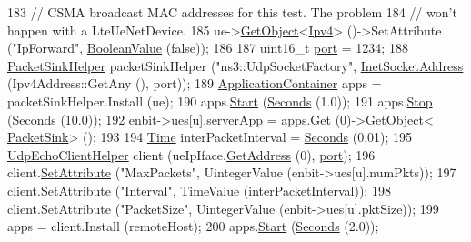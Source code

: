 \begin{DoxyCode}
183           \textcolor{comment}{// CSMA broadcast MAC addresses for this test. The problem}
184           \textcolor{comment}{// won't happen with a LteUeNetDevice. }
185           ue->\hyperlink{classns3_1_1Object_a13e18c00017096c8381eb651d5bd0783}{GetObject}<\hyperlink{classns3_1_1Ipv4}{Ipv4}> ()->SetAttribute (\textcolor{stringliteral}{"IpForward"}, 
      \hyperlink{classns3_1_1BooleanValue}{BooleanValue} (\textcolor{keyword}{false}));
186           
187           uint16\_t \hyperlink{dsdv-manet_8cc_a8e0798404bf2cf5dabb84c5ba9a4f236}{port} = 1234;
188           \hyperlink{classns3_1_1PacketSinkHelper}{PacketSinkHelper} packetSinkHelper (\textcolor{stringliteral}{"ns3::UdpSocketFactory"}, 
      \hyperlink{classns3_1_1InetSocketAddress}{InetSocketAddress} (Ipv4Address::GetAny (), port));
189           \hyperlink{classns3_1_1ApplicationContainer}{ApplicationContainer} apps = packetSinkHelper.Install (ue);
190           apps.\hyperlink{classns3_1_1ApplicationContainer_a8eff87926507020bbe3e1390358a54a7}{Start} (\hyperlink{group__timecivil_ga33c34b816f8ff6628e33d5c8e9713b9e}{Seconds} (1.0));
191           apps.\hyperlink{classns3_1_1ApplicationContainer_adfc52f9aa4020c8714679b00bbb9ddb3}{Stop} (\hyperlink{group__timecivil_ga33c34b816f8ff6628e33d5c8e9713b9e}{Seconds} (10.0));
192           enbit->ues[u].serverApp = apps.\hyperlink{classns3_1_1ApplicationContainer_a9e565807abd4213a56566a7ccd8d7509}{Get} (0)->\hyperlink{classns3_1_1Object_a13e18c00017096c8381eb651d5bd0783}{GetObject}<
      \hyperlink{classns3_1_1PacketSink}{PacketSink}> ();
193           
194           \hyperlink{classns3_1_1Time}{Time} interPacketInterval = \hyperlink{group__timecivil_ga33c34b816f8ff6628e33d5c8e9713b9e}{Seconds} (0.01);
195           \hyperlink{classns3_1_1UdpEchoClientHelper}{UdpEchoClientHelper} client (ueIpIface.\hyperlink{classns3_1_1Ipv4InterfaceContainer_ae63208dcd222be986822937ee4aa828c}{GetAddress} (0), 
      \hyperlink{dsdv-manet_8cc_a8e0798404bf2cf5dabb84c5ba9a4f236}{port});
196           client.\hyperlink{classns3_1_1UdpEchoClientHelper_a11228c069ad896f8ed13f4d37c13f51d}{SetAttribute} (\textcolor{stringliteral}{"MaxPackets"}, UintegerValue (enbit->ues[u].numPkts));
197           client.SetAttribute (\textcolor{stringliteral}{"Interval"}, TimeValue (interPacketInterval));
198           client.SetAttribute (\textcolor{stringliteral}{"PacketSize"}, UintegerValue (enbit->ues[u].pktSize));
199           apps = client.Install (remoteHost);
200           apps.\hyperlink{classns3_1_1ApplicationContainer_a8eff87926507020bbe3e1390358a54a7}{Start} (\hyperlink{group__timecivil_ga33c34b816f8ff6628e33d5c8e9713b9e}{Seconds} (2.0));

\end{DoxyCode}
